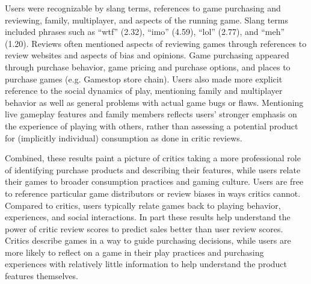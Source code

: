 \documentclass[letterpaper]{article}
\begin{document}
Users were recognizable by slang terms, references to game purchasing and reviewing, family, multiplayer, and aspects of the running game. Slang terms included phrases such as ``wtf'' (2.32), ``imo'' (4.59), ``lol'' (2.77), and ``meh'' (1.20). Reviews often mentioned aspects of reviewing games through references to review websites and aspects of bias and opinions. Game purchasing appeared through purchase behavior, game pricing and purchase options, and places to purchase games (e.g. Gamestop store chain). Users also made more explicit reference to the social dynamics of play, mentioning family and multiplayer behavior as well as general problems with actual game bugs or flaws. Mentioning live gameplay features and family members reflects users' stronger emphasis on the experience of playing with others, rather than assessing a potential product for (implicitly individual) consumption as done in critic reviews.


Combined, these results paint a picture of critics taking a more professional role of identifying purchase products and describing their features, while users relate their games to broader consumption practices and gaming culture. Users are free to reference particular game distributors or review biases in ways critics cannot. Compared to critics, users typically relate games back to playing behavior, experiences, and social interactions. In part these results help understand the power of critic review scores to predict sales better than user review scores. Critics describe games in a way to guide purchasing decisions, while users are more likely to reflect on a game in their play practices and purchasing experiences with relatively little information to help understand the product features themselves.
\end{document}
